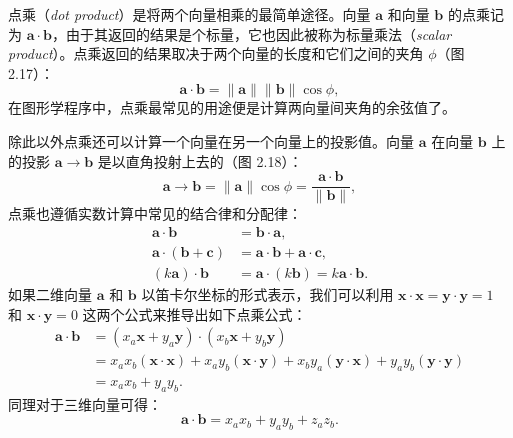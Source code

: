 \documentclass[lang=cn,12pt,marginpar=margintrue]{elegantbook}
\begin{document}

点乘（\textit{dot product}）是将两个向量相乘的最简单途径。向量 $\mathbf{a}$ 和向量 $\mathbf{b}$ 的点乘记为  $\mathbf{a} \cdot \mathbf{b}$，由于其返回的结果是个标量，它也因此被称为标量乘法（\textit{scalar product}）。点乘返回的结果取决于两个向量的长度和它们之间的夹角 $\phi$（图 2.17）：
\begin{equation}
  \mathbf{a} \cdot \mathbf{b} = \|\mathbf{a}\| \|\mathbf{b}\| \cos\phi,
\end{equation}
在图形学程序中，点乘最常见的用途便是计算两向量间夹角的余弦值了。

除此以外点乘还可以计算一个向量在另一个向量上的投影值。向量 $\mathbf{a}$ 在向量 $\mathbf{b}$ 上的投影 $\mathbf{a} \to \mathbf{b}$ 是以直角投射上去的（图 2.18）：
\begin{equation}
  \mathbf{a} \to \mathbf{b} = \|\mathbf{a}\| \cos\phi = \frac{\mathbf{a} \cdot \mathbf{b}}{\|\mathbf{b}\|},
\end{equation}
点乘也遵循实数计算中常见的结合律和分配律：
\begin{equation}
  \begin{aligned}
    \mathbf{a} \cdot \mathbf{b}                & = \mathbf{b} \cdot \mathbf{a},                                   \\
    \mathbf{a} \cdot (\mathbf{b} + \mathbf{c}) & = \mathbf{a} \cdot \mathbf{b} + \mathbf{a} \cdot \mathbf{c},     \\
    (k\mathbf{a}) \cdot \mathbf{b}             & = \mathbf{a} \cdot (k\mathbf{b}) = k\mathbf{a} \cdot \mathbf{b}.
  \end{aligned}
\end{equation}
如果二维向量 $\mathbf{a}$ 和 $\mathbf{b}$ 以笛卡尔坐标的形式表示，我们可以利用 $\mathbf{x} \cdot \mathbf{x} = \mathbf{y} \cdot \mathbf{y} = 1$ 和 $\mathbf{x} \cdot \mathbf{y} = 0$ 这两个公式来推导出如下点乘公式：
\[
  \begin{aligned}
    \mathbf{a} \cdot \mathbf{b} & = (x_a\mathbf{x}+y_a\mathbf{y}) \cdot (x_b\mathbf{x}+y_b\mathbf{y})                                                                            \\
                                & =x_ax_b(\mathbf{x}\cdot\mathbf{x}) + x_ay_b(\mathbf{x}\cdot\mathbf{y}) + x_by_a(\mathbf{y}\cdot\mathbf{x}) + y_ay_b(\mathbf{y}\cdot\mathbf{y}) \\
                                & = x_ax_b + y_ay_b.
  \end{aligned}
\]
同理对于三维向量可得：
\[
  \mathbf{a} \cdot \mathbf{b} = x_ax_b + y_ay_b + z_az_b.
\]
\end{document}
